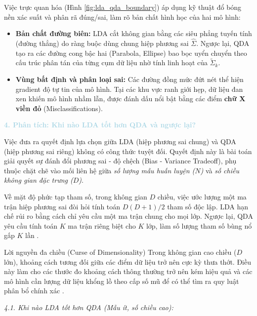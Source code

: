Việc trực quan hóa (Hình \ref{fig:lda_qda_boundary}) áp dụng kỹ thuật đổ bóng nền xác suất và phân rã đúng/sai, làm rõ bản chất hình học của hai mô hình:
\begin{itemize}
    \item \textbf{Bản chất đường biên:} LDA cắt không gian bằng các siêu phẳng tuyến tính (đường thẳng) do ràng buộc dùng chung hiệp phương sai $\hat{\Sigma}$. Ngược lại, QDA tạo ra các đường cong bậc hai (Parabola, Ellipse) bao bọc uyển chuyển theo cấu trúc phân tán của từng cụm dữ liệu nhờ tính linh hoạt của $\tilde{\Sigma}_k$.
    \item \textbf{Vùng bất định và phân loại sai:} Các đường đồng mức đứt nét thể hiện gradient độ tự tin của mô hình. Tại các khu vực ranh giới hẹp, dữ liệu đan xen khiến mô hình nhầm lẫn, được đánh dấu nổi bật bằng các điểm \textbf{chữ X viền đỏ} (Misclassifications).
\end{itemize}

\vspace{0.5em}
\noindent\textcolor{lightblue}{\textbf{4. Phân tích: Khi nào LDA tốt hơn QDA và ngược lại?}}
\vspace{0.5em}

Việc đưa ra quyết định lựa chọn giữa LDA (hiệp phương sai chung) và QDA (hiệp phương sai riêng) không có công thức tuyệt đối. Quyết định này là bài toán giải quyết sự đánh đổi phương sai - độ chệch (Bias - Variance Tradeoff), phụ thuộc chặt chẽ vào mối liên hệ giữa \textit{số lượng mẫu huấn luyện ($N$)} và \textit{số chiều không gian đặc trưng ($D$)}.

Về mặt độ phức tạp tham số, trong không gian $D$ chiều, việc ước lượng một ma trận hiệp phương sai đòi hỏi tính toán $D(D+1)/2$ tham số độc lập. LDA hạn chế rủi ro bằng cách chỉ yêu cầu một ma trận chung cho mọi lớp. Ngược lại, QDA yêu cầu tính toán $K$ ma trận riêng biệt cho $K$ lớp, làm số lượng tham số bùng nổ gấp $K$ lần \cite{tezekbayev2019linear}.

\begin{infobox}{Lời nguyền đa chiều (Curse of Dimensionality)}
Trong không gian cao chiều ($D$ lớn), khoảng cách tương đối giữa các điểm dữ liệu trở nên cực kỳ thưa thớt. Điều này làm cho các thước đo khoảng cách thông thường trở nên kém hiệu quả và các mô hình cần lượng dữ liệu khổng lồ theo cấp số mũ để có thể tìm ra quy luật phân bổ chính xác \cite{parsons2004subspace}.
\end{infobox}

\noindent\textcolor{infocolor}{\textit{4.1. Khi nào LDA tốt hơn QDA (Mẫu ít, số chiều cao):}}

